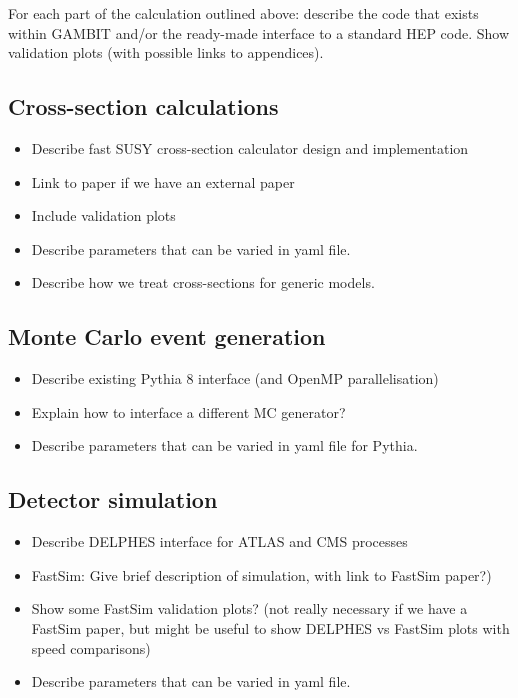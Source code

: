 For each part of the calculation outlined above: describe the code that exists within GAMBIT and/or the ready-made interface to a standard HEP code. Show validation plots (with possible links to appendices).

\subsection{Cross-section calculations}

\begin{itemize}
\item Describe fast SUSY cross-section calculator design and implementation
\item Link to paper if we have an external paper
\item Include validation plots
\item Describe parameters that can be varied in yaml file.
\item Describe how we treat cross-sections for generic models.
\end{itemize}

\subsection{Monte Carlo event generation}

\begin{itemize}
\item Describe existing Pythia 8 interface (and OpenMP parallelisation)
\item Explain how to interface a different MC generator?
\item Describe parameters that can be varied in yaml file for Pythia.
\end{itemize}

\subsection{Detector simulation}

\begin{itemize}
\item Describe DELPHES interface for ATLAS and CMS processes
\item FastSim: Give brief description of simulation, with link to FastSim paper?)
\item Show some FastSim validation plots? (not really necessary if we have a FastSim paper, but might be useful to show DELPHES vs FastSim plots with speed comparisons)
\item Describe parameters that can be varied in yaml file.
\end{itemize}

